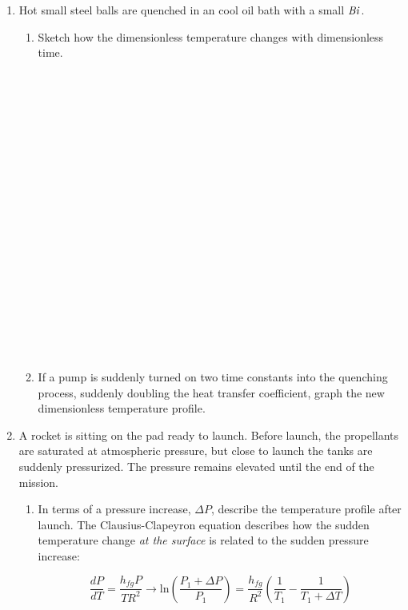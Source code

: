 \documentclass[12pt,letterpaper]{article}
\begin{document}
\begin{enumerate}
    \item Hot small steel balls are quenched in an cool oil bath with a small $\mathit{Bi}$.
    \begin{enumerate}
        \item Sketch how the dimensionless temperature changes with dimensionless time. \\ \\ \\ \\ \\ \\ \\ \\ \\ \\ \\ \\ \\ \\ \\ \\ \\ \\ \\ \\
        \item If a pump is suddenly turned on two time constants into the quenching process, suddenly doubling the heat transfer coefficient, graph the new dimensionless temperature profile.
    \end{enumerate}
    \newpage

    \item A rocket is sitting on the pad ready to launch.
        Before launch, the propellants are saturated at atmospheric pressure, but close to launch the tanks are suddenly pressurized. %
        The pressure remains elevated until the end of the mission.
        
    \begin{enumerate}
        \item In terms of a pressure increase, $\Delta P$, describe the temperature profile after launch.
            The Clausius-Clapeyron equation describes how the sudden temperature change \textit{at the surface} is related to the sudden pressure increase:
            
            \begin{equation*}
                \frac{d P}{d T} = \frac{h_{fg} P}{T R^2} \to \mathrm{ln} \left( \frac{P_1 + \Delta P}{P_1} \right) = \frac{h_{fg}}{R^2} \left( \frac{1}{T_1} - \frac{1}{T_1 + \Delta T} \right)
            \end{equation*}


\end{enumerate}
\end{enumerate}
\end{document}

